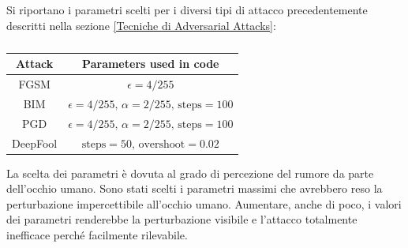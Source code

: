 Si riportano i parametri scelti per i diversi tipi di attacco precedentemente descritti nella sezione \ref{Tecniche di Adversarial Attacks}:
    \begin{table}[!h]
        \centering
        \begin{tabular}{|c|c|}
            \hline
            \rule[-3mm]{0mm}{8mm}
            \textbf{Attack} &\textbf{Parameters used in code} \\ \hline \hline
            \rule[-3mm]{0mm}{8mm}
            FGSM     & $\epsilon=4/255$ \\
            \hline
            \rule[-3mm]{0mm}{8mm}
            BIM      & $\epsilon=4/255,\, \alpha=2/255,\, \text{steps}=100$\\
            \hline
            \rule[-3mm]{0mm}{8mm}
            PGD      & $\epsilon=4/255,\, \alpha=2/255,\, \text{steps}=100$\\
            \hline
            \rule[-3mm]{0mm}{8mm}
            DeepFool & $\text{steps}=50,\, \text{overshoot}=0.02$\\
            \hline
        \end{tabular}
        \caption{}
        \label{Attacks with Parameters}
    \end{table}
    
    La scelta dei parametri è dovuta al grado di percezione del rumore da parte dell'occhio umano. 
    Sono stati scelti i parametri massimi che avrebbero reso la perturbazione impercettibile all'occhio umano.
    Aumentare, anche di poco, i valori dei parametri renderebbe la perturbazione visibile e l'attacco totalmente inefficace perché facilmente rilevabile. 
    
    \newpage
